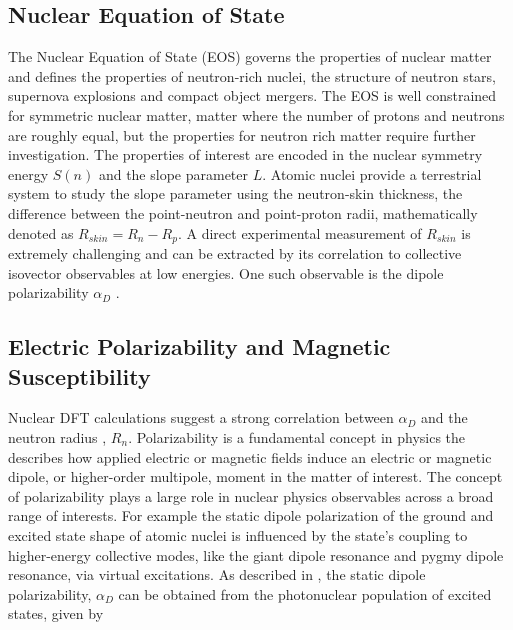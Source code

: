 \documentclass[cnatzke_thesis_proposal.tex]{subfiles}
\begin{document}
\subsection{Nuclear Equation of State}
The Nuclear Equation of State (EOS) governs the properties of nuclear matter and defines the properties of neutron-rich nuclei, the structure of neutron stars, supernova explosions and compact object mergers. \cite{Kaufmann2020} The EOS is well constrained for symmetric nuclear matter, matter where the number of protons and neutrons are roughly equal, but the properties for neutron rich matter require further investigation. \cite{Danielewicz2002} 
The properties of interest are encoded in the nuclear symmetry energy $S(n)$ and the slope parameter $L$. Atomic nuclei provide a terrestrial system to study the slope parameter using the neutron-skin thickness, the difference between the point-neutron and point-proton radii, mathematically denoted as $R_{skin} = R_n - R_p$. \cite{Tsang2012} A direct experimental measurement of $R_{skin}$ is extremely challenging and can be extracted by its correlation to collective isovector observables at low energies. \cite{Birkhan2017} One such observable is the dipole polarizability $\alpha_D$ \cite{Birkhan2017}.

\subsection{Electric Polarizability and Magnetic Susceptibility}

Nuclear DFT calculations suggest a strong correlation between $\alpha_D$ and the neutron radius \cite{hagen_neutron_2016}, $R_{n}$. 
Polarizability is a fundamental concept in physics the describes how applied electric or magnetic fields induce an electric or magnetic dipole, or higher-order multipole, moment in the matter of interest.\cite{jackson_classical_1999} The concept of polarizability plays a large role in nuclear physics observables across a broad range of interests. For example the static dipole polarization of the ground and excited state shape of atomic nuclei is influenced by the state's coupling to higher-energy collective modes, like the giant dipole resonance and pygmy dipole resonance, via virtual excitations. As described in \cite{soderstrom_electromagnetic_2020}, the static dipole polarizability, $\alpha_D$ can be obtained from the photonuclear population of excited states, given by
\end{document}

